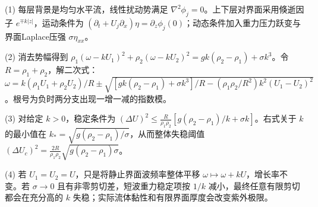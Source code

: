 (1) 每层背景是均匀水平流，线性扰动势满足 \(\nabla^2\phi_j=0\)。上下层对界面采用倏逝因子 \(e^{\mp k|z|}\)，运动条件为 \((\partial_t+U_j\partial_x)\eta=\partial_z\phi_j(0)\)；动态条件加入重力压力跃变与界面Laplace压强 \(\sigma\eta_{xx}\)。

(2) 消去势幅得到 \(\rho_1(\omega-kU_1)^2+\rho_2(\omega-kU_2)^2=gk(\rho_2-\rho_1)+\sigma k^3\)。令 \(R=\rho_1+\rho_2\)，解二次式：\(\boxed{\omega=k(\rho_1U_1+\rho_2U_2)/R\pm\sqrt{[gk(\rho_2-\rho_1)+\sigma k^3]/R-(\rho_1\rho_2/R^2)k^2(U_1-U_2)^2}}\)。根号为负时两分支出现一增一减的指数模。

(3) 对给定 \(k>0\)，稳定条件为 \((\Delta U)^2\le\frac{R}{\rho_1\rho_2}[g(\rho_2-\rho_1)/k+\sigma k]\)。右式关于 \(k\) 的最小值在 \(\boxed{k_*=\sqrt{g(\rho_2-\rho_1)/\sigma}}\)，从而整体失稳阈值 \(\boxed{(\Delta U_c)^2=\frac{2R}{\rho_1\rho_2}\sqrt{g(\rho_2-\rho_1)\sigma}}\)。

(4) 若 \(U_1=U_2=U\)，只是将静止界面波频率整体平移 \(\omega\mapsto\omega+kU\)，增长率不变。若 \(\sigma\to0\) 且有非零剪切差，短波重力稳定项按 \(1/k\) 减小，最终任意有限剪切都会在充分高的 \(k\) 失稳；实际流体黏性和有限界面厚度会改变紫外极限。
